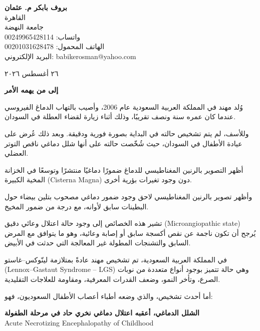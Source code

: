 \documentclass[12pt,a4paper]{article}
\begin{document}
\begin{flushright}
\textbf{بروف بابكر م. عثمان}\\
القاهرة\\
جامعة النهضة\\
واتساب: 00249965428114\\
الهاتف المحمول: 00201031628478\\
البريد الإلكتروني: \textenglish{babikerosman@yahoo.com}
\end{flushright}

\begin{flushleft}
٢٦ أغسطس ٢٠٢٦
\end{flushleft}

\vspace{1em}
\begin{center}
\Large\textbf{إلى من يهمه الأمر}
\end{center}

وُلد مهند في المملكة العربية السعودية عام 2006، وأصيب بالتهاب الدماغ الفيروسي عندما كان عمره سنة ونصف تقريبًا، وذلك أثناء زيارة لقضاء العطلة في السودان.

وللأسف، لم يتم تشخيص حالته في البداية بصورة فورية ودقيقة. وبعد ذلك عُرض على عيادة الأطفال في السودان، حيث شُخّصت حالته على أنها شلل دماغي ناقص التوتر العضلي.

أظهر التصوير بالرنين المغناطيسي للدماغ ضمورًا دماغيًا منتشرًا وتوسعًا في الخزانة المخية الكبيرة (\textenglish{Cisterna Magna}) دون وجود تغيرات بؤرية أخرى.

وأظهر تصوير بالرنين المغناطيسي لاحق وجود ضمور دماغي مصحوب بتلين بيضاء حول البطينات سابق لأوانه، مع درجة من ضمور المخيخ.

تشير هذه الخصائص إلى وجود حالة اعتلال وعائي دقيق (\textenglish{Microangiopathic state}) يُرجح أن تكون ناجمة عن نقص أكسجة سابق أو إصابة وعائية، وهو ما يتوافق مع المرض السابق والتشنجات المطولة غير المعالجة التي حدثت في الأبيض.

في المملكة العربية السعودية، تم تشخيص مهند عادةً بمتلازمة لينّوكس--غاستو (\textenglish{Lennox--Gastaut Syndrome -- LGS}) وهي حالة تتميز بوجود أنواع متعددة من نوبات الصرع، وتأخر النمو، وضعف القدرات المعرفية، ومقاومة للعلاجات التقليدية.

أما أحدث تشخيص، والذي وضعه أطباء أعصاب الأطفال السعوديون، فهو:

\begin{center}
\textbf{الشلل الدماغي، أعقبه اعتلال دماغي نخري حاد في مرحلة الطفولة}\\
\textenglish{Acute Necrotizing Encephalopathy of Childhood}
\end{center}
\end{document}
